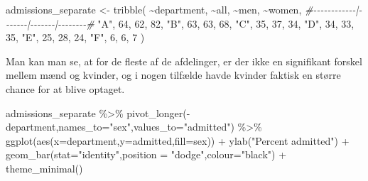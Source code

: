 \documentclass[
]{book}
\newenvironment{Shaded}{\begin{snugshade}}{\end{snugshade}}
\newcommand{\AttributeTok}[1]{\textcolor[rgb]{0.77,0.63,0.00}{#1}}
\newcommand{\CommentTok}[1]{\textcolor[rgb]{0.56,0.35,0.01}{\textit{#1}}}
\newcommand{\DecValTok}[1]{\textcolor[rgb]{0.00,0.00,0.81}{#1}}
\newcommand{\FunctionTok}[1]{\textcolor[rgb]{0.00,0.00,0.00}{#1}}
\newcommand{\NormalTok}[1]{#1}
\newcommand{\OtherTok}[1]{\textcolor[rgb]{0.56,0.35,0.01}{#1}}
\newcommand{\SpecialCharTok}[1]{\textcolor[rgb]{0.00,0.00,0.00}{#1}}
\newcommand{\StringTok}[1]{\textcolor[rgb]{0.31,0.60,0.02}{#1}}
\begin{document}
\begin{Shaded}
\begin{Highlighting}[]
\NormalTok{admissions\_separate }\OtherTok{\textless{}{-}} \FunctionTok{tribble}\NormalTok{(}
  \SpecialCharTok{\textasciitilde{}}\NormalTok{department,   }\SpecialCharTok{\textasciitilde{}}\NormalTok{all,   }\SpecialCharTok{\textasciitilde{}}\NormalTok{men,  }\SpecialCharTok{\textasciitilde{}}\NormalTok{women,}
  \CommentTok{\#{-}{-}{-}{-}{-}{-}{-}{-}{-}{-}{-}{-}|{-}{-}{-}{-}{-}{-}{-}|{-}{-}{-}{-}{-}{-}{-}|{-}{-}{-}{-}{-}{-}{-}{-}\#}
  \StringTok{"A"}\NormalTok{,            }\DecValTok{64}\NormalTok{,     }\DecValTok{62}\NormalTok{,      }\DecValTok{82}\NormalTok{,}
  \StringTok{"B"}\NormalTok{,            }\DecValTok{63}\NormalTok{,     }\DecValTok{63}\NormalTok{,      }\DecValTok{68}\NormalTok{,}
  \StringTok{"C"}\NormalTok{,            }\DecValTok{35}\NormalTok{,     }\DecValTok{37}\NormalTok{,      }\DecValTok{34}\NormalTok{,}
  \StringTok{"D"}\NormalTok{,            }\DecValTok{34}\NormalTok{,     }\DecValTok{33}\NormalTok{,      }\DecValTok{35}\NormalTok{,}
  \StringTok{"E"}\NormalTok{,            }\DecValTok{25}\NormalTok{,     }\DecValTok{28}\NormalTok{,      }\DecValTok{24}\NormalTok{,}
  \StringTok{"F"}\NormalTok{,             }\DecValTok{6}\NormalTok{,      }\DecValTok{6}\NormalTok{,       }\DecValTok{7}
\NormalTok{)}
\end{Highlighting}
\end{Shaded}

Man kan man se, at for de fleste af de afdelinger, er der ikke en signifikant forskel mellem mænd og kvinder, og i nogen tilfælde havde kvinder faktisk en større chance for at blive optaget.

\begin{Shaded}
\begin{Highlighting}[]
\NormalTok{admissions\_separate }\SpecialCharTok{\%\textgreater{}\%} 
  \FunctionTok{pivot\_longer}\NormalTok{(}\SpecialCharTok{{-}}\NormalTok{department,}\AttributeTok{names\_to=}\StringTok{"sex"}\NormalTok{,}\AttributeTok{values\_to=}\StringTok{"admitted"}\NormalTok{) }\SpecialCharTok{\%\textgreater{}\%}
  \FunctionTok{ggplot}\NormalTok{(}\FunctionTok{aes}\NormalTok{(}\AttributeTok{x=}\NormalTok{department,}\AttributeTok{y=}\NormalTok{admitted,}\AttributeTok{fill=}\NormalTok{sex)) }\SpecialCharTok{+} 
  \FunctionTok{ylab}\NormalTok{(}\StringTok{"Percent admitted"}\NormalTok{) }\SpecialCharTok{+}
  \FunctionTok{geom\_bar}\NormalTok{(}\AttributeTok{stat=}\StringTok{"identity"}\NormalTok{,}\AttributeTok{position =} \StringTok{"dodge"}\NormalTok{,}\AttributeTok{colour=}\StringTok{"black"}\NormalTok{) }\SpecialCharTok{+} 
  \FunctionTok{theme\_minimal}\NormalTok{()}
\end{Highlighting}
\end{Shaded}
\end{document}

